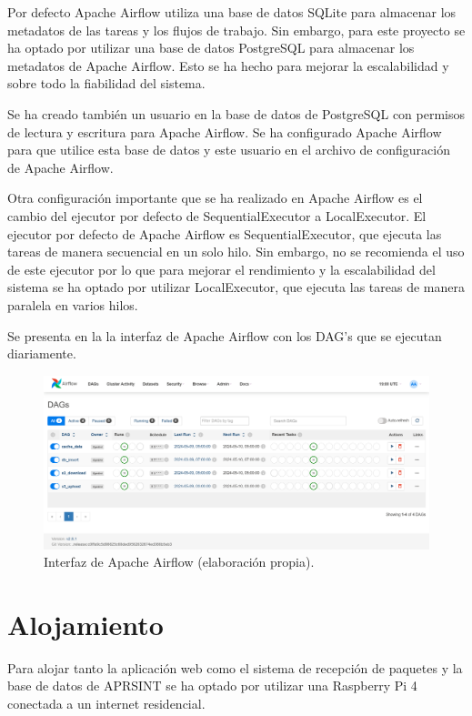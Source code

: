 Por defecto Apache Airflow utiliza una base de datos SQLite para almacenar los metadatos de las tareas y los flujos de trabajo. Sin embargo, para este proyecto se ha optado por utilizar una base de datos PostgreSQL para almacenar los metadatos de Apache Airflow. Esto se ha hecho para mejorar la escalabilidad y sobre todo la fiabilidad del sistema.

Se ha creado también un usuario en la base de datos de PostgreSQL con permisos de lectura y escritura para Apache Airflow. Se ha configurado Apache Airflow para que utilice esta base de datos y este usuario en el archivo de configuración de Apache Airflow.

Otra configuración importante que se ha realizado en Apache Airflow es el cambio del ejecutor por defecto de SequentialExecutor a LocalExecutor. El ejecutor por defecto de Apache Airflow es SequentialExecutor, que ejecuta las tareas de manera secuencial en un solo hilo. Sin embargo, no se recomienda el uso de este ejecutor por lo que para mejorar el rendimiento y la escalabilidad del sistema se ha optado por utilizar LocalExecutor, que ejecuta las tareas de manera paralela en varios hilos.

Se presenta en la  la interfaz de Apache Airflow con los DAG's que se ejecutan diariamente.

\begin{figure}[h]
	\centering
	\includegraphics[width=1\textwidth]{Imagenes/Chapter_4/airflow_dashboard.png}
	\caption[Interfaz de Apache Airflow.]{Interfaz de Apache Airflow (elaboración propia).}
	\label{fig:airflow-dashboard}
\end{figure}

\section{Alojamiento}
Para alojar tanto la aplicación web como el sistema de recepción de paquetes y la base de datos de APRSINT se ha optado por utilizar una Raspberry Pi 4 conectada a un internet residencial.

